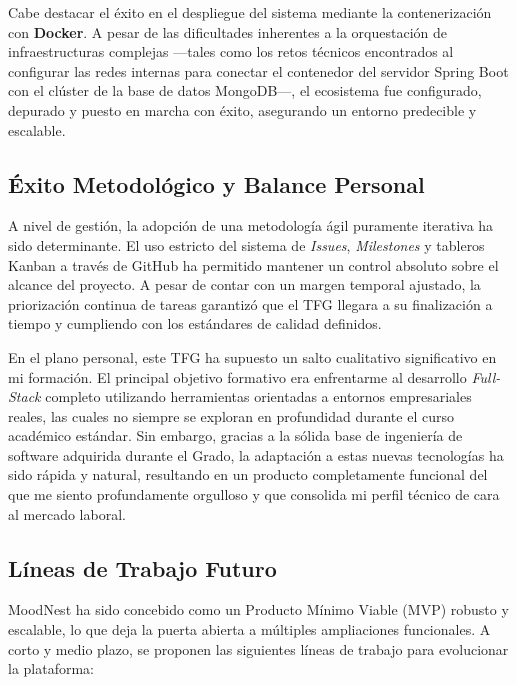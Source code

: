 Cabe destacar el éxito en el despliegue del sistema mediante la contenerización con \textbf{Docker}. A pesar de las dificultades inherentes a la orquestación de infraestructuras complejas —tales como los retos técnicos encontrados al configurar las redes internas para conectar el contenedor del servidor Spring Boot con el clúster de la base de datos MongoDB—, el ecosistema fue configurado, depurado y puesto en marcha con éxito, asegurando un entorno predecible y escalable.

\subsection{Éxito Metodológico y Balance Personal}

A nivel de gestión, la adopción de una metodología ágil puramente iterativa ha sido determinante. El uso estricto del sistema de \textit{Issues}, \textit{Milestones} y tableros Kanban a través de GitHub ha permitido mantener un control absoluto sobre el alcance del proyecto. A pesar de contar con un margen temporal ajustado, la priorización continua de tareas garantizó que el TFG llegara a su finalización a tiempo y cumpliendo con los estándares de calidad definidos.

En el plano personal, este TFG ha supuesto un salto cualitativo significativo en mi formación. El principal objetivo formativo era enfrentarme al desarrollo \textit{Full-Stack} completo utilizando herramientas orientadas a entornos empresariales reales, las cuales no siempre se exploran en profundidad durante el curso académico estándar. Sin embargo, gracias a la sólida base de ingeniería de software adquirida durante el Grado, la adaptación a estas nuevas tecnologías ha sido rápida y natural, resultando en un producto completamente funcional del que me siento profundamente orgulloso y que consolida mi perfil técnico de cara al mercado laboral.

\subsection{Líneas de Trabajo Futuro}

MoodNest ha sido concebido como un Producto Mínimo Viable (MVP) robusto y escalable, lo que deja la puerta abierta a múltiples ampliaciones funcionales. A corto y medio plazo, se proponen las siguientes líneas de trabajo para evolucionar la plataforma:

